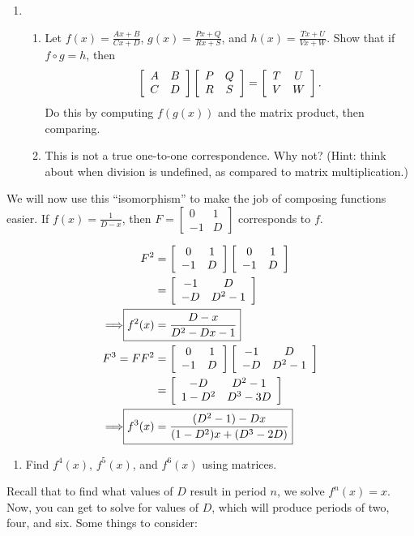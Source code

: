 \documentclass[../gatm.tex]{subfiles}
\begin{document}
\begin{enumerate}
\item \begin{enumerate}
\item Let $f(x)=\frac{Ax+B}{Cx+D}$, $g(x)=\frac{Px+Q}{Rx+S}$, and $h(x)=\frac{Tx+U}{Vx+W}$. Show that if $f\circ g = h$, then
$$\left[\begin{array}{cc} A & B \\ C & D \end{array}\right]\left[\begin{array}{cc} P & Q \\ R & S \end{array}\right]=\left[\begin{array}{cc} T & U \\ V & W \end{array}\right].$$
Do this by computing $f(g(x))$ and the matrix product, then comparing.
\item This is not a true one-to-one correspondence. Why not? (Hint: think about when division is undefined, as compared to matrix multiplication.)
\end{enumerate}
\end{enumerate}

We will now use this ``isomorphism'' to make the job of composing functions easier. If $f(x)=\frac{1}{D-x}$, then $F=\left[\begin{smallmatrix} 0 & 1 \\ -1 & D \end{smallmatrix}\right]$ corresponds to $f$.

\begin{align*}
F^2 &= \twomat{0}{1}{-1}{D}\twomat{0}{1}{-1}{D} \\
&= \twomat{-1}{D}{-D}{D^2-1} \\
\Longrightarrow \Aboxed{f^2(x) &= \frac{D-x}{D^2-Dx-1}} \\
F^3 = FF^2 &= \twomat{0}{1}{-1}{D}\twomat{-1}{D}{-D}{D^2-1} \\
&= \twomat{-D}{D^2-1}{1-D^2}{D^3-3D} \\
\Longrightarrow \Aboxed{f^3(x) &= \frac{(D^2-1)-Dx}{(1-D^2)x+(D^3-2D)}} \\
\end{align*}

\begin{enumerate}
\item Find $f^4(x)$, $f^5(x)$, and $f^6(x)$ using matrices.
\end{enumerate}

Recall that to find what values of $D$ result in period $n$, we solve $f^n(x)=x$. Now, you can get to solve for values of $D$, which will produce periods of two, four, and six. Some things to consider:
\end{document}

